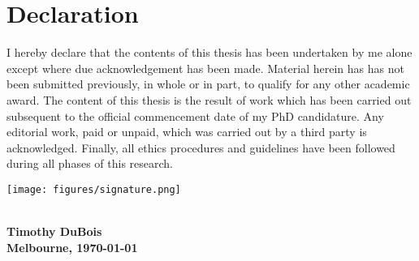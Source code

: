 \chapter{Declaration}
\vspace{3cm}
I hereby declare that the contents of this thesis has been undertaken by me alone except where due acknowledgement has been made.
Material herein has has not been submitted previously, in whole or in part, to qualify for any other academic award.
The content of this thesis is the result of work which has been carried out subsequent to the official commencement date of my PhD candidature.
Any editorial work, paid or unpaid, which was carried out by a third party is acknowledged. Finally, all ethics procedures and guidelines have been followed during all phases of this research.

\vspace{2cm}
\hspace{1.8cm}\texttt{[image: figures/signature.png]}

\vspace{-0.35cm}
\parbox[b][2cm][t]{7cm}{\centering
    \dotfill\\
    {\textbf{Timothy DuBois}} \\
    \textbf{Melbourne, \today}
} 